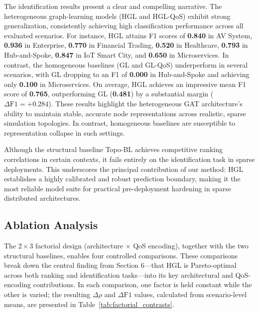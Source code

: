 \documentclass[sigconf,9pt,anonymous]{acmart}
\begin{document}
The identification results present a clear and compelling narrative. The heterogeneous graph-learning models (HGL and HGL-QoS) exhibit strong generalization, consistently achieving high classification performance across all evaluated scenarios. For instance, HGL attains F1 scores of \textbf{0.840} in AV System, \textbf{0.936} in Enterprise, \textbf{0.770} in Financial Trading, \textbf{0.520} in Healthcare, \textbf{0.793} in Hub-and-Spoke, \textbf{0.847} in IoT Smart City, and \textbf{0.650} in Microservices. In contrast, the homogeneous baselines (GL and GL-QoS) underperform in several scenarios, with GL dropping to an F1 of \textbf{0.000} in Hub-and-Spoke and achieving only \textbf{0.100} in Microservices. On average, HGL achieves an impressive mean F1 score of \textbf{0.765}, outperforming GL (\textbf{0.481}) by a substantial margin ($\Delta\text{F1} = +0.284$). These results highlight the heterogeneous GAT architecture's ability to maintain stable, accurate node representations across realistic, sparse simulation topologies. In contrast, homogeneous baselines are susceptible to representation collapse in such settings.

Although the structural baseline Topo-BL achieves competitive ranking correlations in certain contexts, it fails entirely on the identification task in sparse deployments. This underscores the principal contribution of our method: HGL establishes a highly calibrated and robust prediction boundary, making it the most reliable model suite for practical pre-deployment hardening in sparse distributed architectures.

\subsection{Ablation Analysis}

The $2\times3$ factorial design (architecture $\times$ QoS encoding), together with the two structural baselines, enables four controlled comparisons. These comparisons break down the central finding from Section 6—that HGL is Pareto-optimal across both ranking and identification tasks—into its key architectural and QoS-encoding contributions. In each comparison, one factor is held constant while the other is varied; the resulting $\Delta\rho$ and $\Delta\text{F1}$ values, calculated from scenario-level means, are presented in Table~\ref{tab:factorial_contrasts}.
\end{document}
